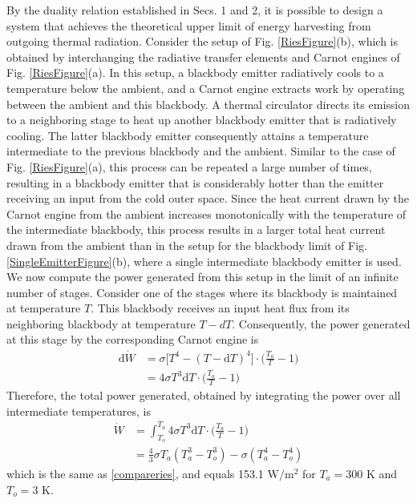 \documentclass[notitlepage,onecolumn,aps,showpacs,preprintnumbers,amsmath,amssymb,superscriptaddress]{revtex4-1}
\begin{document}
By the duality relation established in Secs. 1 and 2, it is possible to design a system that achieves the theoretical upper limit of energy harvesting from outgoing thermal radiation. Consider the setup of Fig. \ref{RiesFigure}(b), which is obtained by interchanging the radiative transfer elements and Carnot engines of Fig. \ref{RiesFigure}(a). In this setup, a blackbody emitter radiatively cools to a temperature below the ambient, and a Carnot engine extracts work by operating between the ambient and this blackbody. A thermal circulator directs its emission to a neighboring stage to heat up another blackbody emitter that is radiatively cooling. The latter blackbody emitter consequently attains a temperature intermediate to the previous blackbody and the ambient. Similar to the case of Fig. \ref{RiesFigure}(a), this process can be repeated a large number of times, resulting in a blackbody emitter that is considerably hotter than the emitter receiving an input from the cold outer space. Since the heat current drawn by the Carnot engine from the ambient increases monotonically with the temperature of the intermediate blackbody, this process results in a larger total heat current drawn from the ambient than in the setup for the blackbody limit of Fig. \ref{SingleEmitterFigure}(b), where a single intermediate blackbody emitter is used. We now compute the power generated from this setup in the limit of an infinite number of stages. Consider one of the stages where its blackbody is maintained at temperature $T$. This blackbody receives an input heat flux from its neighboring blackbody at temperature $T-dT$. Consequently, the power generated at this stage by the corresponding Carnot engine is
\begin{align}
\textrm{d}\dot{W} &= \sigma\big[T^4-(T-\textrm{d}T)^4\big]\cdot\Big(\frac{T_a}{T}-1\Big) \nonumber\\
&=4\sigma T^3\textrm{d}T\cdot\Big(\frac{T_a}{T}-1\Big) 
\end{align}
Therefore, the total power generated, obtained by integrating the power over all intermediate temperatures, is
\begin{align}
\dot{W} &= \int_{T_o}^{T_a}4\sigma T^3\textrm{d}T\cdot\Big(\frac{T_a}{T}-1\Big) \nonumber\\
&= \frac{4}{3}\sigma T_a(T_a^3-T_o^3) - \sigma(T_a^4-T_o^4)
\end{align}
which is the same as \eqref{compareries}, and equals 153.1 $\mathrm{W/m^2}$ for $T_a = 300$ K and $T_o = 3$ K. \\
\end{document}
